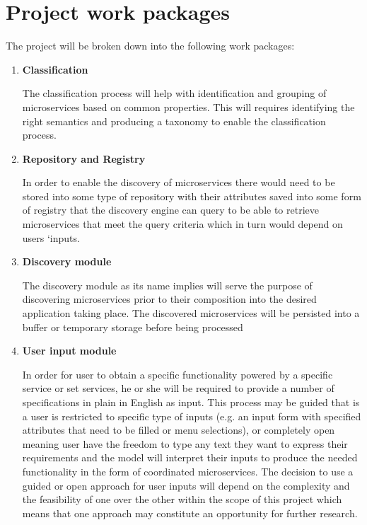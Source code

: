 \documentclass{article}
\begin{document}
\section{Project work packages}

The project will be broken down into the following work packages:

\begin{enumerate}

\item \textbf{Classification}

The classification process will help with identification and grouping of microservices based on common properties. This will requires identifying the right semantics and producing a taxonomy to enable the classification process. 


\item \textbf{Repository and Registry}


In order to enable the discovery of microservices there would need to be stored into some type of repository with their attributes saved into some form of registry that the discovery engine can query to be able to retrieve microservices that meet the query criteria which in turn would depend on users ‘inputs. 


\item \textbf{Discovery module}


The discovery module as its name implies will serve the purpose of discovering microservices prior to their composition into the desired application taking place. The discovered microservices will be persisted into a buffer or temporary storage before being processed 


\item \textbf{User input module}


In order for user to obtain a specific functionality powered by a specific service or set services, he or she will be required to provide a number of specifications in plain in English as input. This process may be guided that is a user is restricted to specific type of inputs (e.g. an input form with specified attributes that need to be filled or menu selections), or completely open meaning user have the freedom to type any text they want to express their requirements and the model will interpret their inputs to produce the needed functionality in the form of coordinated microservices. The decision to use a guided or open approach for user inputs will depend on the complexity and the feasibility of one over the other within the scope of this project which means that one approach may constitute an opportunity for further research.



\end{enumerate}
\end{document}
